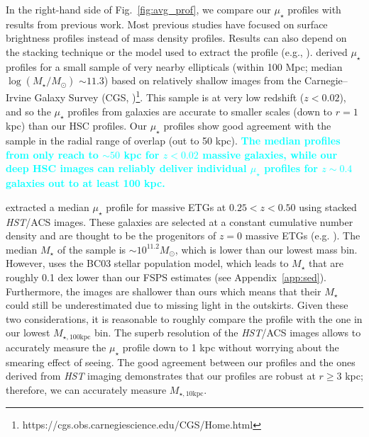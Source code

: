 \documentclass[fleqn,usenatbib]{mnras}
\def\mstar{{$M_{\star}$}}
\def\logms{{$\log (M_{\star}/M_{\odot})$}}
\def\minn{{$M_{\star,10\mathrm{kpc}}$}}
\def\mtot{{$M_{\star,100\mathrm{kpc}}$}}
\def\mden{{$\mu_{\star}$}}
\newcommand{\song}[1]{\textcolor{cyan}{\textbf{#1}}}
\begin{document}
    In the right-hand side of Fig.~\ref{fig:avg_prof}, we compare our \mden{} 
    profiles with results from previous work. 
    Most previous studies have focused on surface brightness profiles instead 
    of mass density profiles.  
    Results can also depend on the stacking technique or the model used to extract 
    the profile (e.g., \citealt{Tal2011, DSouza2014}). 
    \citet{Huang2013a} derived \mden{} profiles for a small sample of very nearby 
    ellipticals (within 100 Mpc; median \logms{} ${\sim} 11.3$) based on relatively 
    shallow images from the Carnegie--Irvine Galaxy Survey 
    (CGS, \citealt{CGS1})\footnote{https://cgs.obs.carnegiescience.edu/CGS/Home.html}.  
    This sample is at very low redshift ($z<0.02$), and so the \mden{} profiles from 
    \citet{Huang2013a} galaxies are accurate to smaller scales (down to $r=1$ kpc) 
    than our HSC profiles.  
    Our \mden{} profiles show good agreement with the \citet{Huang2013a} sample in 
    the radial range of overlap (out to 50 kpc). 
    \song{
    The median profiles from \citet{Huang2013a} only reach to ${\sim} 50$ kpc for 
    $z<0.02$ massive galaxies, while our deep HSC images can reliably deliver 
    individual \mden{} profiles for $z{\sim} 0.4$ galaxies out to at least 100 kpc.
    }  
    
    \citet{Patel2013} extracted a median \mden{} profile for massive ETGs at 
    $0.25 < z < 0.50$ using stacked \textit{HST}/ACS images. 
    These galaxies are selected at a constant cumulative number density and are 
    thought to be the progenitors of $z=0$ massive ETGs (e.g. \citealt{Leja2013}).  
    The median \mstar{} of the \citet{Patel2013} sample is 
    ${\sim} 10^{11.2} M_{\odot}$, which is lower than our lowest mass bin. 
    However, \citet{Patel2013} uses the BC03 stellar population model, which leads to 
    \mstar{} that are roughly 0.1 dex lower than our FSPS estimates 
    (see Appendix~\ref{app:sed}). 
    Furthermore, the \citet{Patel2013} images are shallower than ours which means 
    that their \mstar{} could still be underestimated due to missing light in the 
    outskirts. 
    Given these two considerations, it is reasonable to roughly compare the 
    \citet{Patel2013} profile with the one in our lowest \mtot{} bin. 
    The superb resolution of the \textit{HST}/ACS images allows \citet{Patel2013} to 
    accurately measure the \mden{} profile down to 1 kpc without worrying about the
    smearing effect of seeing. 
    The good agreement between our profiles and the ones derived from \textit{HST} 
    imaging demonstrates that our profiles are robust at $r\geq 3$ kpc; therefore, 
    we can accurately measure \minn{}.
    
\end{document}

